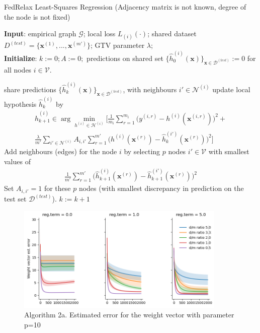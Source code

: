 \documentclass{article}
\newcommand{\graph}{\mathcal{G}}
\begin{document}
\begin{algorithm}[htbp]
	\caption{FedRelax Least-Squares Regression (Adjacency matrix is not known, degree of the node is not fixed)}
	\label{alg:algorithm1}
	{\bf Input}: empirical graph $\graph$; 
	local loss $L_{(i)}{(\cdot)}$; shared dataset $D^{(test)} = \{\mathbf{x}^{(1)}, ..., \mathbf{x}^{(m')}\}$; GTV parameter $\lambda$; \\
	{\bf Initialize}: $k:=0; A:=0;$ predictions on shared set $\{\widehat{h}_{0}^{(i)}(\mathbf{x})\}_{\mathbf{x} \in \mathcal{D}^(test)}:=0$ for all nodes $i \in \mathcal{V}$.
	\begin{algorithmic}[1]
		\State share predictions $\{\widehat{h}_{k}^{(i)}(\mathbf{x})\}_{\mathbf{x} \in \mathcal{D}^(test)}$, 
		with neighbours $i' \in \mathcal{N}^{(i)}$ 
		\State update local hypothesis $\widehat{h}_{k}^{(i)}$ by
            \begin{multline*}
            \widehat{h}_{k+1}^{(i)} \in  \arg \min_{h^{(i)} \in \mathcal{H}^{(i)}} 
            \biggl[ \frac{1}{m_i}  \sum_{r=1}^{m_i} \biggl( y^{(i,r)} - h^{(i)}(\mathbf{x}^{(i,r)})  \biggr)^2 + \\
            \frac{\lambda}{m'} \sum_{i' \in \mathcal{N}^{(i)}}A_{i,i'}\sum_{r=1}^{m'} \biggl( h^{(i)}(\mathbf{x}^{(r)}) - \widehat{h}_{k}^{(i')}(\mathbf{x}^{(r)}) \biggr)^2 \biggr]
            \end{multline*}
        \EndFor
        \State Add neighbours (edges) for the node $i$ by selecting $p$ nodes $i' \in \mathcal{V}$ with smallest values of
             \begin{align}
                \frac{1}{m'} \sum_{r=1}^{m'} \biggl( \widehat{h}_{k+1}^{(i)}(\mathbf{x}^{(r)}) - \widehat{h}_{k+1}^{(i')}(\mathbf{x}^{(r)}) \biggr)^2 
             \end{align}
        \State Set $A_{i,i'} = 1$ for these $p$ nodes (with smallest discrepancy in prediction on the test set $\mathcal{D}^{(test)}$).
        \EndFor
        \State $k := k+1$
		\EndWhile
	\end{algorithmic}
\end{algorithm}

\begin{figure}[h]
\includegraphics[width=10cm]{Linreg_Torch_665413_est_error_Algo2a_nn10.png}
\caption{Algorithm 2a. Estimated error for the weight vector with parameter p=10}
\end{figure}
\end{document}
